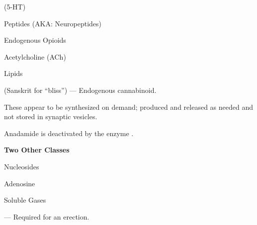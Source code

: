 \begin{coloredlist}
\begin{coloredlist}

        \item {} %
        \begin{coloredlist}
            \item {} (5-HT) %
            \item {} %
        \end{coloredlist}
        \item Peptides (AKA: Neuropeptides)
        \begin{coloredlist}
            \item Endogenous Opioids
        \end{coloredlist}
        \item Acetylcholine (ACh)
        \item Lipids
        \begin{coloredlist}
            \item {} (Sanskrit for ``bliss'') — Endogenous cannabinoid.
            \item These appear to be synthesized on demand; produced and released as needed and not stored in synaptic vesicles.
            \item Anadamide is deactivated by the enzyme .
        \end{coloredlist}
        \item \textbf{Two Other Classes}
        \begin{coloredlist}
            \item Nucleosides
            \begin{coloredlist}
                \item Adenosine
            \end{coloredlist}
            \item Soluble Gases
            \begin{coloredlist}
                \item {} — Required for an erection.
            \end{coloredlist}
        \end{coloredlist}
    \end{coloredlist}
\end{coloredlist}

